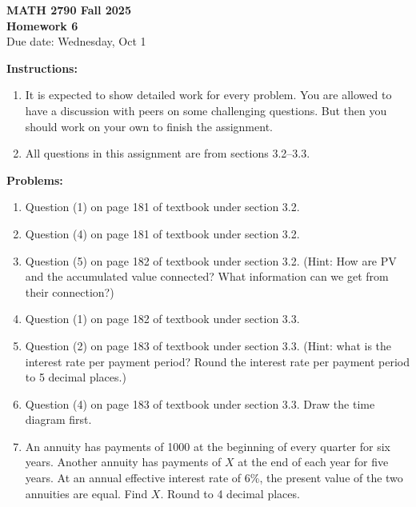 \documentclass[12pt]{article}
\begin{document}
\begin{center}
\textbf{\Large MATH 2790 Fall 2025}\\[1em]
\textbf{\Large Homework 6}\\[0.5em]
Due date: Wednesday, Oct 1
\end{center}

\bigskip

\textbf{Instructions:}

\begin{enumerate}[label=(\alph*)]
\item It is expected to show detailed work for every problem. You are allowed to have a
discussion with peers on some challenging questions. But then you should work on
your own to finish the assignment.

\item All questions in this assignment are from sections 3.2--3.3.
\end{enumerate}

\bigskip

\textbf{Problems:}

\begin{enumerate}
\item Question (1) on page 181 of textbook under section 3.2.

\item Question (4) on page 181 of textbook under section 3.2.

\item Question (5) on page 182 of textbook under section 3.2. (Hint: How are PV and the
accumulated value connected? What information can we get from their connection?)

\item Question (1) on page 182 of textbook under section 3.3.

\item Question (2) on page 183 of textbook under section 3.3. (Hint: what is the interest
rate per payment period? Round the interest rate per payment period to 5 decimal
places.)

\item Question (4) on page 183 of textbook under section 3.3. Draw the time diagram first.

\item An annuity has payments of 1000 at the beginning of every quarter for six years.
Another annuity has payments of $X$ at the end of each year for five years. At an
annual effective interest rate of 6\%, the present value of the two annuities are equal.
Find $X$. Round to 4 decimal places.
\end{enumerate}
\end{document}

